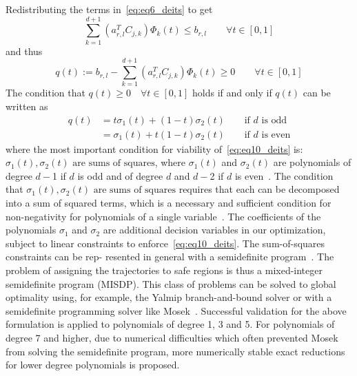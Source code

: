 Redistributing the terms in~\ref{eq:eq6_deits} to get\begin{equation} \label{eq:eq8_deits}
\sum_{k=1}^{d+1} (a_{r,l}^{T}C_{j,k}) \Phi_{k}(t) \leq b_{r,l} \quad \quad \forall t \in [0,1] 
\end{equation} and thus \begin{equation} \label{eq:eq9_deits}
q(t) := b_{r,l} - \sum_{k=1}^{d+1} (a_{r,l}^{T}C_{j,k}) \Phi_{k}(t) \geq 0 \quad \quad \forall t \in [0,1] 
\end{equation}
The condition that $q(t) \geq 0 \quad \forall t \in [0, 1]$ holds if and only if
$q(t)$ can be written as	\begin{align} \label{eq:eq10_deits}
q(t) &= t\sigma_{1}(t) + (1-t)\sigma_{2}(t) \quad \quad \text{if $d$ is odd} \nonumber\\  &= \sigma_{1}(t) + t(1-t)\sigma_{2}(t) \quad \quad \text{if $d$ is even}
\end{align}
where the most important condition for viability of~\ref{eq:eq10_deits} is: 
$\sigma_{1}(t), \sigma_{2}(t) \text{ are sums of squares}$, where $\sigma_{1}(t)$ and $\sigma_{2}(t)$ are polynomials of degree $d -$1 if
$d$ is odd and of degree $d$ and $d -$2 if $d$ is even~\cite{parrilo2006sums}. The condition that $\sigma_{1}(t), \sigma_{2}(t) \text{ are sums of squares}$ requires that
each can be decomposed into a sum of squared terms, which
is a necessary and sufficient condition for non-negativity for
polynomials of a single variable~\cite{parrilo2006sums}. The coefficients of
the polynomials $\sigma_{1}$ and $\sigma_{2}$ are additional decision variables
in our optimization, subject to linear constraints to enforce~\ref{eq:eq10_deits}.  The sum-of-squares constraints can be rep-
resented in general with a semidefinite program~\cite{powers1998algorithm}. The problem of assigning the trajectories to safe regions is thus
a mixed-integer semidefinite program (MISDP). This class
of problems can be solved to global optimality using, for
example, the Yalmip branch-and-bound solver or with a semidefinite programming solver like Mosek~\cite{aps2014mosek}. Successful validation for the above formulation is applied to polynomials of degree 1, 3 and 5. For polynomials of degree 7 and higher, due to numerical difficulties
which often prevented Mosek from solving the semidefinite
program, more numerically stable exact reductions for lower degree polynomials is proposed.

